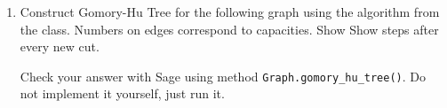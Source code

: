 \documentclass[11pt, oneside]{article}
\begin{document}
\begin{enumerate}
  \item %
    Construct Gomory-Hu Tree for the following graph using the algorithm from the class. 
    Numbers on edges correspond to capacities.
    Show Show steps after every new cut.
    \begin{center}
    \end{center}
    Check your answer with Sage using method \verb|Graph.gomory_hu_tree()|. Do not implement it yourself, just run it.
\end{enumerate}
\end{document}
